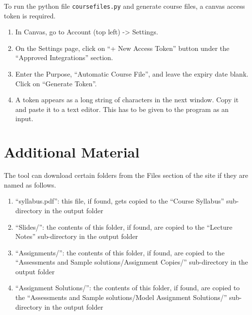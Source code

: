 \documentclass{article}
\begin{document}
To run the python file \texttt{coursefiles.py} and generate course
files, a canvas access token is required.

\begin{enumerate}
\def\labelenumi{\arabic{enumi}.}
\item
  In Canvas, go to Account (top left) -\textgreater{} Settings.
\item
  On the Settings page, click on ``+ New Access Token'' button under the
  ``Approved Integrations'' section.
\item
  Enter the Purpose, ``Automatic Course File'', and leave the expiry
  date blank. Click on ``Generate Token''.
\item
  A token appears as a long string of characters in the next window.
  Copy it and paste it to a text editor. This has to be given to the
  program as an input.
\end{enumerate}

\section{Additional Material}

The tool can download certain folders from the Files section of the site
if they are named as follows.

\begin{enumerate}
\def\labelenumi{\arabic{enumi}.}
\item
  ``syllabus.pdf'': this file, if found, gets copied to the ``Course
  Syllabus'' sub-directory in the output folder
\item
  ``Slides/'': the contents of this folder, if found, are copied to the
  ``Lecture Notes'' sub-directory in the output folder
\item
  ``Assignments/'': the contents of this folder, if found, are copied to
  the ``Assessments and Sample solutions/Assignment Copies/''
  sub-directory in the output folder
\item
  ``Assignment Solutions/'': the contents of this folder, if found, are
  copied to the ``Assessments and Sample solutions/Model Assignment
  Solutions/'' sub-directory in the output folder
\end{enumerate}
\end{document}
